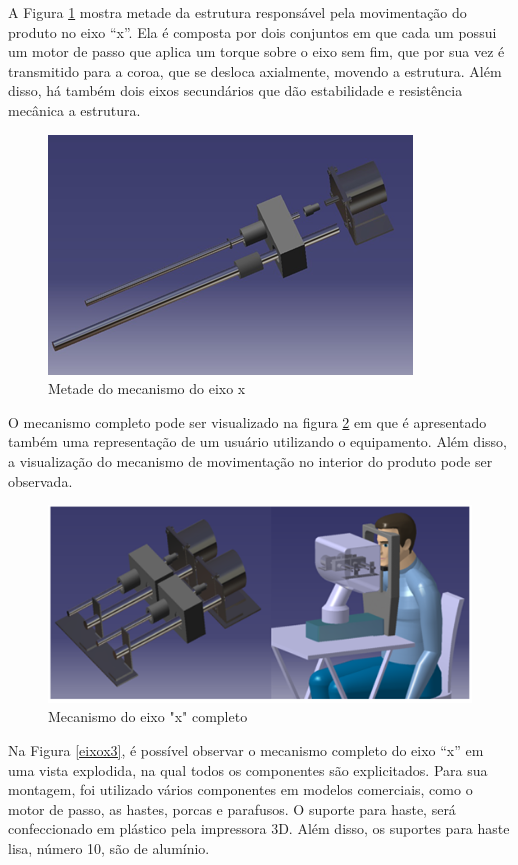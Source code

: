 A Figura \ref{eixox} mostra metade da estrutura responsável pela movimentação do produto no eixo “x”. Ela é composta por dois conjuntos em que cada um possui um motor de passo que aplica um torque sobre o eixo sem fim, que por sua vez é transmitido para a coroa, que se desloca axialmente, movendo a estrutura. Além disso, há também dois eixos secundários que dão estabilidade e resistência mecânica a estrutura.

\begin{figure}[H]
		\centering
			\includegraphics[scale=1.0]{figuras/eixox.png}
		\caption{Metade do mecanismo do eixo x}
		\label{eixox}
\end{figure}

O mecanismo completo pode ser visualizado na figura \ref{eixox2} em que é apresentado também uma representação de um usuário utilizando o equipamento. Além disso, a visualização do mecanismo de movimentação no interior do produto pode ser observada.

\begin{figure}[H]
		\centering
			\includegraphics[scale=1.0]{figuras/eixox2.png}
		\caption{Mecanismo do eixo "x" completo}
		\label{eixox2}
\end{figure}

Na Figura \ref{eixox3}, é possível observar o mecanismo completo do eixo “x” em uma vista explodida, na qual todos os componentes são explicitados. Para sua montagem, foi utilizado vários componentes em modelos comerciais, como o motor de passo, as hastes, porcas e parafusos. O suporte para haste, será confeccionado em plástico pela impressora 3D. Além disso, os suportes para haste lisa, número 10, são de alumínio.


